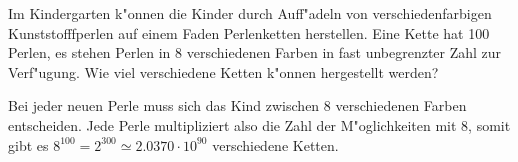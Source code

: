 Im Kindergarten k"onnen die Kinder durch Auff"adeln von
verschiedenfarbigen Kunststofffperlen auf einem Faden
Perlenketten herstellen. Eine Kette hat 100 Perlen,
es stehen Perlen in 8 verschiedenen Farben in fast unbegrenzter
Zahl zur Verf"ugung.
Wie viel verschiedene Ketten k"onnen hergestellt werden?

\begin{loesung}
Bei jeder neuen Perle muss sich das Kind zwischen 8 verschiedenen
Farben entscheiden. Jede Perle multipliziert also die Zahl
der M"oglichkeiten mit $8$, somit gibt es
$8^{100}=2^{300}\simeq2.0370\cdot10^{90}$
verschiedene Ketten.
\end{loesung}


